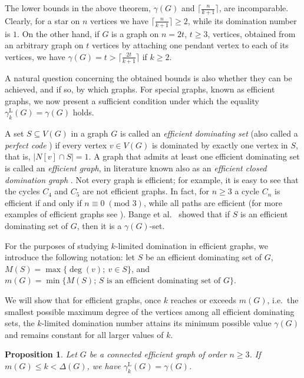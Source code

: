 \documentclass[11pt]{article}
\newtheorem{proposition}[theorem]{Proposition}
\newcommand{\gammakL}{\gamma_k^{\mathrm L}}
\begin{document}
The lower bounds in the above theorem, $\gamma(G)$ and $\lceil \frac{n}{k+1} \rceil$, are incomparable. Clearly, for a star on $n$ vertices we have $\lceil \frac{n}{k+1}\rceil \ge 2$, while its domination number is $1$. 
On the other hand, if $G$ is a graph on $n=2t$, $t\geq 3$, vertices, obtained from an arbitrary graph on $t$ vertices by attaching one pendant vertex to each of its vertices, we have $\gamma(G)=t>\lceil \tfrac{2t}{k+1} \rceil$ if $k\geq2$.

\medskip

A natural question concerning the obtained bounds is also whether they can be achieved, and if so, by which graphs.
For special graphs, known as efficient graphs, we now present a sufficient condition under which the equality $\gammakL(G) = \gamma(G)$ holds. 



A set $S \subseteq V(G)$ in a graph $G$ is called an \emph{efficient dominating set} (also called a \textit{perfect code} \cite{Biggs}) if every vertex $v \in V(G)$ is dominated by exactly one vertex in $S$, that is, $|N[v] \cap S| = 1$. 
A graph that admits at least one efficient dominating set is called an \emph{efficient graph}, in literature known also as an \emph{efficient closed domination graph} \cite{kpy}. Not every graph is efficient; for example, it is easy to see that the cycles $C_4$ and $C_5$ are not efficient graphs. In fact, for $n\geq 3$ a cycle $C_n$ is efficient if and only if $n\equiv 0 \; (\text{mod } 3)$, while all paths are efficient (for more examples of efficient graphs see \cite{HHH3}).
Bange et al.~\cite{Bange} showed that if $S$ is an efficient dominating set of $G$, then it is a $\gamma(G)$-set.

For the purposes of studying $k$-limited domination in efficient graphs, we introduce the following notation: let $S$ be an efficient dominating set of $G$, $M(S)=\max\{\deg(v);\ v\in S\}$, and $m(G)=\min\{M(S);\, S\text{ is an efficient dominating set of }G\}$.

We will show that for efficient graphs, once $k$ reaches or exceeds $m(G)$, i.e.~the smallest possible maximum degree of the vertices among all efficient dominating sets, the $k$-limited domination number attains its minimum possible value $\gamma(G)$ and remains constant for all larger values of $k$. 


\begin{proposition} 
\label{efficient}
Let $G$ be a connected efficient graph of order $n\geq 3$. If $m(G)\leq k<\Delta(G)$, we have
$\gammakL(G)=\gamma(G)$.
\end{proposition}
\end{document}
